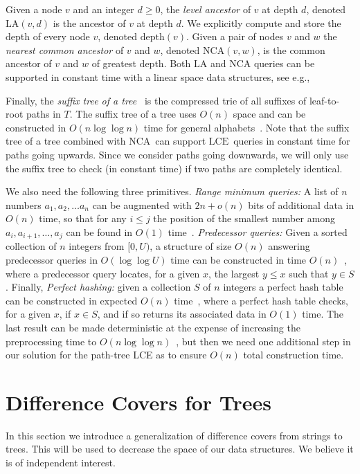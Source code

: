 \documentclass [10pt]{article}
\newcommand{\depth}{\ensuremath{\mathrm{depth}}}
\newcommand{\LA}{\ensuremath{\mathrm{LA}}}
\newcommand{\NCA}{\ensuremath{\mathrm{NCA}}}
\newcommand{\LCE}{\ensuremath{\mathrm{LCE}}}
\begin{document}
Given a node $v$ and an integer $d \ge 0$, the \emph{level ancestor} of $v$ at depth $d$, denoted $\LA(v, d)$ is the ancestor of $v$ at depth $d$.
We explicitly compute and store the depth of every node $v$, denoted $\depth(v)$.
Given a pair of nodes $v$ and $w$ the \emph{nearest common ancestor} of $v$ and $w$, denoted $\NCA(v, w)$, is the common ancestor of $v$ and $w$ of greatest depth. Both $\LA$ and $\NCA$ queries can be supported in constant time with a linear space data structures, see e.g.,~\cite{BV1994, Dietz1991, BFC2004, AH2000, GRV2006, AGKR2004,HT1984, BFC2000, FH2011}

Finally, the \emph{suffix tree of a tree}~\cite{Kosaraju1989, Breslauer1998, shibuya1999} is the compressed trie of all suffixes of leaf-to-root paths in $T$. The suffix tree of a tree uses $O(n)$ space and  can be constructed  in $O(n\log \log n)$ time for general alphabets~\cite{shibuya1999}. Note that the suffix tree of a tree combined with \NCA\ can support \LCE\ queries in constant time for paths going upwards. Since we consider paths going downwards, we will only use the suffix tree to check (in constant time) if two paths are completely identical.

We also need the following three primitives. {\em Range minimum queries:} A list of $n$ numbers $a_{1},a_{2},\ldots a_{n}$ can be augmented with $2n+o(n)$ bits of additional
data in $O(n)$ time, so that for any $i\leq j$ the position of the smallest number among $a_{i},a_{i+1},\ldots,a_{j}$ can be found in $O(1)$
time~\cite{FH2011}.  {\em Predecessor queries:} Given a sorted collection of $n$ integers from $[0,U)$, a structure of size $O(n)$ answering predecessor queries in
$O(\log\log U)$ time can be constructed in time $O(n)$~\cite{BKZ1977}, where a predecessor query locates, for a given $x$, the largest $y\leq x$
such that $y\in S$. Finally,  {\em Perfect hashing:}  given a collection $S$ of $n$ integers a perfect hash table can be constructed in expected $O(n)$ time~\cite{FKS},
where a perfect hash table checks, for a given $x$, if $x\in S$, and if so returns its associated data in $O(1)$ time. The last result can be
made deterministic at the expense of increasing the preprocessing time to $O(n\log\log n)$~\cite{Ruzic2004}, but then we need one additional step
in our solution for the path-tree LCE as to ensure $O(n)$ total construction time.

\section{Difference Covers for Trees}
In this section we introduce a generalization of difference covers from strings to trees. This will be used to decrease the space of our data structures. We believe it is of independent interest.
\end{document}
